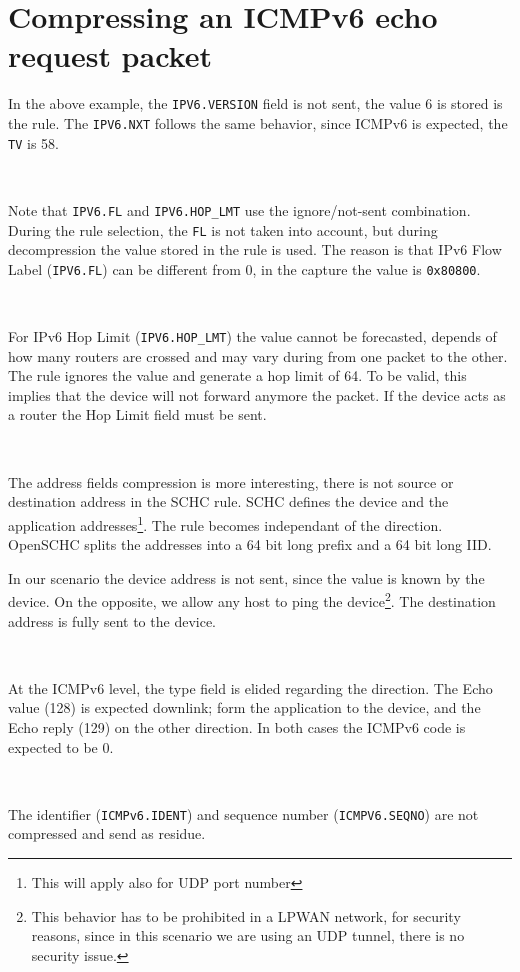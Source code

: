\section{Compressing an ICMPv6 echo request packet}

In the above example, the \texttt{IPV6.VERSION} field is not sent, the value 6 is stored is the rule. 
The \texttt{IPV6.NXT} follows the same behavior, since ICMPv6 is expected, the \texttt{TV} is 58.

~

Note that \texttt{IPV6.FL} and \texttt{IPV6.HOP\_LMT} use the ignore/not-sent combination. During the rule selection, the \texttt{FL} is not taken into account, but during decompression the value stored in the rule is used. The reason is that IPv6 Flow Label (\texttt{IPV6.FL}) can be different from 0, in the capture the value is \texttt{0x80800}. 

~

For IPv6 Hop Limit  (\texttt{IPV6.HOP\_LMT}) the value cannot be forecasted, depends of how many routers are crossed and may vary during from one packet to the other. The rule ignores the value and generate a hop limit of 64. To be valid, this implies that the device will not forward anymore the packet. If the device acts as a router the Hop Limit field must be sent.

~

The address fields compression is more interesting, there is not source or destination address in the SCHC rule. SCHC defines the device  and the application addresses\footnote{This will apply also for UDP port number}. The rule becomes independant of the direction. OpenSCHC splits the addresses into a 64 bit long prefix and a 64 bit long IID. 

In our scenario the device address is not sent, since the value is known by the device. On the opposite, we allow any host to ping the device\footnote{This behavior has to be prohibited in a LPWAN network, for security reasons, since in this scenario we are using an UDP tunnel, there is no security issue.}. The destination address is fully sent to the device.

~~

At the ICMPv6 level, the type field is elided regarding the direction. The Echo value (128) is expected downlink; form the application to the device, and the Echo reply (129) on the other direction. In both cases the ICMPv6 code is expected to be 0.

~~~

The identifier (\texttt{ICMPv6.IDENT}) and sequence number (\texttt{ICMPV6.SEQNO}) are not compressed and send as residue.

